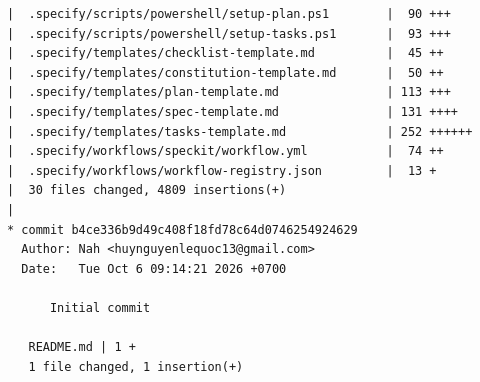 \documentclass[12pt]{article}
\begin{document}
\begin{lstlisting}[numbers=none,breaklines=true]
|  .specify/scripts/powershell/setup-plan.ps1        |  90 +++
|  .specify/scripts/powershell/setup-tasks.ps1       |  93 +++
|  .specify/templates/checklist-template.md          |  45 ++
|  .specify/templates/constitution-template.md       |  50 ++
|  .specify/templates/plan-template.md               | 113 +++
|  .specify/templates/spec-template.md               | 131 ++++
|  .specify/templates/tasks-template.md              | 252 ++++++
|  .specify/workflows/speckit/workflow.yml           |  74 ++
|  .specify/workflows/workflow-registry.json         |  13 +
|  30 files changed, 4809 insertions(+)
|
* commit b4ce336b9d49c408f18fd78c64d0746254924629
  Author: Nah <huynguyenlequoc13@gmail.com>
  Date:   Tue Oct 6 09:14:21 2026 +0700

      Initial commit

   README.md | 1 +
   1 file changed, 1 insertion(+)
\end{lstlisting}
\end{document}
